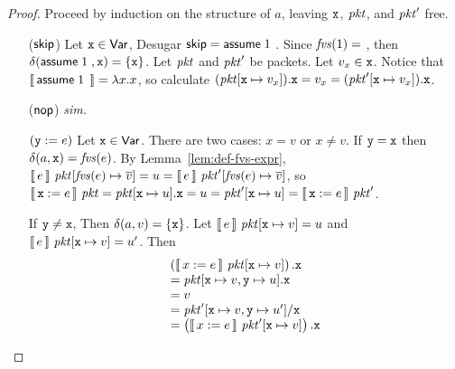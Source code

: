 \begin{proof}
  Proceed by induction on the structure of $a$, leaving
  $\texttt{x}$, $\mathit{pkt}$, and $\mathit{pkt}'$ free.
  \begin{enumerate}[align=left]
  \item[($\mathsf{skip}$)] Let $\texttt{x} \in \mathsf{Var}$, Desugar
    $\mathsf{skip} = \mathsf{assume}\; 1\;$. Since $\mathit{fvs}(1) = {}$, then
    $\delta(\mathsf{assume}\; 1\;, \texttt{x}) = \{\texttt{x}\}$. Let $\mathit{pkt}$
    and $\mathit{pkt}'$ be packets. Let $v_x \in \texttt{x}$. Notice that
    $\llbracket\,\mathsf{assume}\; 1\;\,\rrbracket = \lambda x.x$, so calculate
    $(\mathit{pkt}[\texttt{x} \mapsto v_x]).\texttt{x} = v_x=
    (\mathit{pkt}'[\texttt{x} \mapsto v_x]).\texttt{x}$.
  \item[($\mathsf{nop}$)] \textit{sim.}
  \item[$(\texttt{y}:=e)$] Let $\texttt{x} \in
    \mathsf{Var}$. There are two cases: $x = v$ or $x \neq v$.  If $\texttt{y}
    = \texttt{x}$ then $\delta(a,\texttt{x}) =
    \mathit{fvs}(e)$. By Lemma~\ref{lem:def-fvs-expr},
    $\llbracket\,e\,\rrbracket~\mathit{pkt}[\mathit{fvs}(e) \mapsto \overline{v}] = u =
    \llbracket\,e\,\rrbracket~\mathit{pkt}'[\mathit{fvs}(e) \mapsto \overline{v}]$, so $\llbracket\,\texttt{x}:=e\,\rrbracket~\mathit{pkt} = \mathit{pkt}[\texttt{x} \mapsto
    u].\texttt{x} = u = \mathit{pkt}'[\texttt{x} \mapsto u] =
    \llbracket\,\texttt{x}:=e\,\rrbracket~\mathit{pkt}'$.

    If $\texttt{y} \neq \texttt{x}$, Then
    $\delta(a,v) = \{\texttt{x}\}$. Let
    $\llbracket\,e\,\rrbracket~\mathit{pkt}[\texttt{x} \mapsto v] = u$ and
    $\llbracket\,e\,\rrbracket~\mathit{pkt}[\texttt{x} \mapsto v] = u'$. Then
    \[\begin{array}l
        \left(\bracbb{x:=e}~\pkt[\var{x} \mapsto v]\right).\var{x}\\
        = \pkt[\var{x} \mapsto v,\var{y} \mapsto u].\var{x} \\
        = v \\
        = \pkt'[\var{x}\mapsto v, \var{y}\mapsto u']/\var{x} \\
        = \left(\bracbb{x:=e}~\pkt'[\var{x} \mapsto v]\right).\var{x}
      \end{array}\]


\end{enumerate}
\end{proof}
